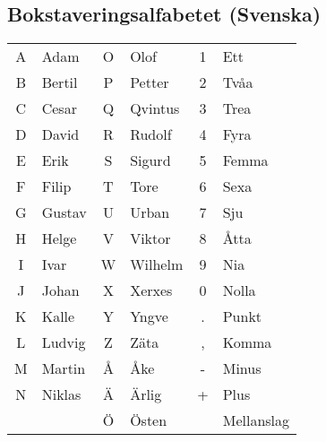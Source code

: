 \subsection{Bokstaveringsalfabetet (Svenska)}

\begin{center}
\begin{tabular}{cl|cl|cl }
	A & Adam   & O & Olof    & 1 & Ett \\
	B & Bertil & P & Petter  & 2 & Tvåa \\
	C & Cesar  & Q & Qvintus & 3 & Trea \\
	D & David  & R & Rudolf  & 4 & Fyra \\
	E & Erik   & S & Sigurd  & 5 & Femma \\
	F & Filip  & T & Tore    & 6 & Sexa \\
	G & Gustav & U & Urban   & 7 & Sju \\
	H & Helge  & V & Viktor  & 8 & Åtta \\
	I & Ivar   & W & Wilhelm & 9 & Nia \\
	J & Johan  & X & Xerxes  & 0 & Nolla \\
	K & Kalle  & Y & Yngve   & . & Punkt\\
	L & Ludvig & Z & Zäta    & , & Komma\\
	M & Martin & Å & Åke     & - & Minus\\
	N & Niklas & Ä & Ärlig   & + & Plus\\
	  &        & Ö & Östen   &   & Mellanslag\\
\end{tabular}
\end{center}


